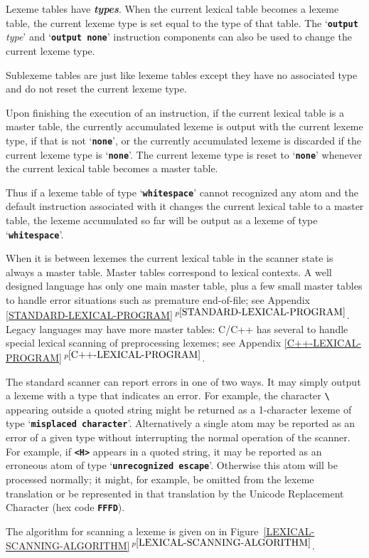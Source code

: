 \documentclass[12pt]{article}
\newcommand{\TT}[1]{{\tt \bfseries #1}}
\newcommand{\ikey}[2]{{\bf \em #1}\index{#2}}
\newcommand{\itemref}[1]{\ref{#1}$\,^{p\pageref{#1}}$}
\begin{document}
Lexeme tables have \ikey{types}{type!of lexeme table}.
When the current lexical table becomes a lexeme table,
the current lexeme type is set equal to the type of that table.
The `\TT{output} {\em type}' and `\TT{output none}'
instruction components can also be
used to change the current lexeme type.

Sublexeme tables are just like lexeme tables except they
have no associated type and do not reset the current lexeme type.

Upon finishing the execution of an instruction, if the
current lexical table is a master table,
the currently accumulated lexeme is output
with the current lexeme type, if that is not `\TT{none}', or the
currently accumulated lexeme is discarded if the current lexeme
type is `\TT{none}'.
The current lexeme type is reset to `\TT{none}' whenever
the current lexical table becomes a master table.

Thus if a lexeme table of
type `\TT{whitespace}' cannot recognized any atom and
the default instruction associated with it
changes the current lexical table to a master table,
the lexeme accumulated so far will
be output as a lexeme of type `\TT{whitespace}'.

When it is between lexemes the current lexical table in the scanner state
is always a master table.  Master tables correspond to lexical
contexts.  A well designed language has only one main master
table, plus a few small master tables to handle error situations
such as premature end-of-file;
see Appendix \itemref{STANDARD-LEXICAL-PROGRAM}.
Legacy languages
may have more master tables: C/C++ has several to handle
special lexical scanning of preprocessing lexemes;
see Appendix \itemref{C++-LEXICAL-PROGRAM}.

The standard scanner can report errors in one of two ways.  It may
simply output a lexeme with a type that indicates an error.  For
example, the character \TT{\textbackslash} appearing outside a quoted string
might be returned as a 1-character lexeme of type `\TT{misplaced
character}'.  Alternatively a single atom may be reported as an
error of a given type without interrupting the normal operation
of the scanner.  For example, if \TT{<H>} appears in a quoted
string, it may be reported as an erroneous atom of type
`\TT{unrecognized escape}'.  Otherwise this atom will be processed
normally; it might, for example, be omitted from the lexeme
translation or be represented in that translation by the Unicode
Replacement Character (hex code \TT{FFFD}).

The algorithm for scanning a lexeme is given on in
Figure~\itemref{LEXICAL-SCANNING-ALGORITHM}.
\end{document}
